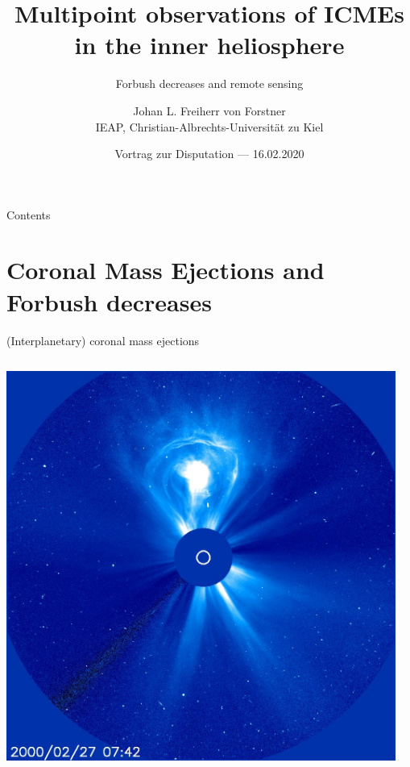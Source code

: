 \documentclass[10pt,aspectratio=169,usenames,dvipsnames]{beamer}
\title{Multipoint observations of ICMEs in the inner heliosphere}
\subtitle{Forbush decreases and remote sensing}
\author{Johan L. Freiherr von Forstner\\IEAP, Christian-Albrechts-Universität zu Kiel}
\date{Vortrag zur Disputation --- 16.02.2020}
\begin{document}
\maketitle

\begin{frame}{Contents}
    \tableofcontents
\end{frame}

\section{Coronal Mass Ejections and Forbush decreases}

\begin{frame}{(Interplanetary) coronal mass ejections}
    \begin{columns}
        \begin{column}{0.45\textwidth}
            \centering
            \includegraphics[width=\textwidth]{images/20000227_0742_c3_1024.jpg}
        \end{column}
        \begin{column}{0.45\textwidth}
        	\centering

\end{column}
\end{columns}
\end{frame}
\end{document}
